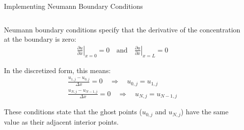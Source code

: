 \documentclass{beamer}
\begin{document}
\begin{frame}{Implementing Neumann Boundary Conditions}
    \vspace{-0.5cm}
    \begin{columns}
        \begin{column}{0.5\textwidth}
            \small
            Neumann boundary conditions specify that the derivative of the concentration at the boundary is zero:
            \begin{align*}
                \left. \frac{\partial u}{\partial x} \right|_{x=0} = 0 \quad \text{and} \quad \left. \frac{\partial u}{\partial x} \right|_{x=L} = 0
            \end{align*}
            
            In the discretized form, this means:
            \begin{align*}
                \frac{u_{1,j} - u_{0,j}}{\Delta x} = 0 \quad \Rightarrow \quad u_{0,j} = u_{1,j}\\
                \frac{u_{N,j} - u_{N-1,j}}{\Delta x} = 0 \quad \Rightarrow \quad u_{N,j} = u_{N-1,j}
            \end{align*}
            
            These conditions state that the ghost points ($u_{0,j}$ and $u_{N,j}$) have the same value as their adjacent interior points.
        \end{column}
        
        \begin{column}{0.5\textwidth}
\end{column}
\end{columns}
\end{frame}
\end{document}
